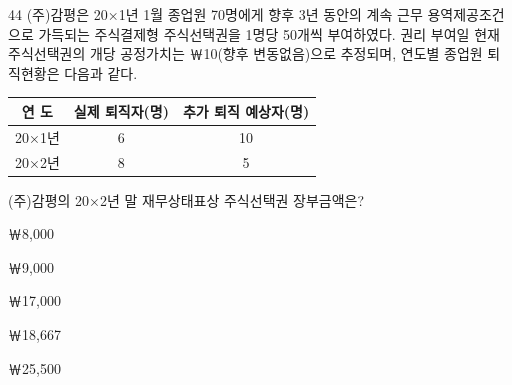 \begin{question}{44}
(주)감평은 20×1년 1월 종업원 70명에게 향후 3년 동안의 계속 근무 용역제공조건으로 가득되는 주식결제형 주식선택권을 1명당 50개씩 부여하였다. 권리 부여일 현재 주식선택권의 개당 공정가치는 ￦10(향후 변동없음)으로 추정되며, 연도별 종업원 퇴직현황은 다음과 같다.
\par{\small\centering\begin{tabular}{|c|c|c|}\hline
연 도 & 실제 퇴직자(명) & 추가 퇴직 예상자(명) \\ \hline
20×1년 & 6 & 10 \\ \hline
20×2년 & 8 & 5 \\ \hline
\end{tabular}\par}
(주)감평의 20×2년 말 재무상태표상 주식선택권 장부금액은?
\begin{choices}
  \item ￦8,000
  \item ￦9,000
  \item ￦17,000
  \item ￦18,667
  \item ￦25,500
\end{choices}
\end{question}
